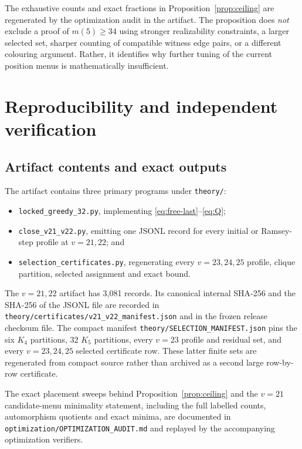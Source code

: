 \documentclass[11pt]{article}
\theoremstyle{remark}
\begin{document}
The exhaustive counts and exact fractions in Proposition~\ref{prop:ceiling}
are regenerated by the optimization audit in the artifact.  The proposition
does \emph{not} exclude a proof of $m(5)\ge34$ using stronger realizability
constraints, a larger selected set, sharper counting of compatible witness
edge pairs, or a different colouring argument.  Rather, it identifies why
further tuning of the current position menus is mathematically insufficient.

\section{Reproducibility and independent verification}\label{sec:artifact}

\subsection{Artifact contents and exact outputs}

The artifact contains three primary programs under \texttt{theory/}:
\begin{itemize}[leftmargin=2em]
\item \texttt{locked\_greedy\_32.py}, implementing
      \eqref{eq:free-last}--\eqref{eq:Q};
\item \texttt{close\_v21\_v22.py}, emitting one JSONL record for every
      initial or Ramsey-step profile at $v=21,22$; and
\item \texttt{selection\_certificates.py}, regenerating every
      $v=23,24,25$ profile, clique partition, selected assignment and exact
      bound.
\end{itemize}
The $v=21,22$ artifact has 3,081 records.  Its canonical internal SHA-256
and the SHA-256 of the JSONL file are recorded in
\texttt{theory/certificates/v21\_v22\_manifest.json} and in the frozen
release checksum file.  The compact manifest
\texttt{theory/SELECTION\_MANIFEST.json} pins the six $K_4$ partitions, 32
$K_5$ partitions, every $v=23$ profile and residual set, and every
$v=23,24,25$ selected certificate row.  These latter finite sets are
regenerated from compact source rather than archived as a second large
row-by-row certificate.

The exact placement sweeps behind Proposition~\ref{prop:ceiling} and the
$v=21$ candidate-menu minimality statement, including the full labelled
counts, automorphism quotients and exact minima, are documented in
\texttt{optimization/OPTIMIZATION\_AUDIT.md} and replayed by the accompanying
optimization verifiers.
\end{document}
